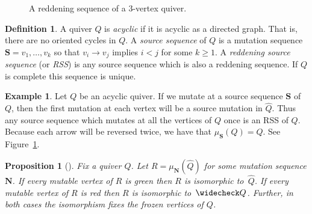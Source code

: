 \documentclass[11pt, letterpaper]{amsart}
\newtheorem{proposition}[theorem]{Proposition}
\theoremstyle{definition}
\newtheorem{example}[theorem]{Example}
\newtheorem{definition}[theorem]{Definition}
\numberwithin{equation}{section}
\begin{document}
\begin{figure}[ht]
\caption{A reddening sequence of a $3$-vertex quiver.}
\label{fig:source seq}
\end{figure}


\begin{definition}
\label{def:acyclic}
A quiver $Q$ is \emph{acyclic} if it is acyclic as a directed graph. That is, there are no oriented cycles in $Q$.
A \emph{source sequence} of $Q$ is a mutation sequence $\mathbf{S} = v_1, \ldots, v_k$ so that $v_i \rightarrow v_j$ implies $ i < j$ for some $k \geq 1$.
A \emph{reddening source sequence} (or \emph{RSS}) is any source sequence which is also a reddening sequence. 
If $Q$ is complete this sequence is unique.
\end{definition}

\begin{example}
\label{eg:source seq}
Let $Q$ be an acyclic quiver. 
If we mutate at a source sequence $\mathbf S$ of $Q$, then the first mutation at each vertex will be a source mutation in $\widehat{Q}$.
Thus any source sequence which mutates at all the vertices of $Q$ once is an RSS of $Q$.
Because each arrow will be reversed twice, we have that $\mu_{\mathbf S}(Q)= Q.$
See Figure~\ref{fig:source seq}. 
\end{example}


\begin{proposition}[{\cite[Proposition 2.10]{MR3250044}}] %
\label{prop:red/green gives iso}
Fix a quiver $Q$. 
Let $R = \mu_{\mathbf{N}}(\widehat Q)$ for some mutation sequence $\mathbf{N}$.
If every mutable vertex of $R$ is green then $R$ is isomorphic to~$\widehat Q$.
If every mutable vertex of $R$ is red then $R$ is isomorphic to~$\widecheck Q$.
Further, in both cases the isomorphism fixes the frozen vertices of $Q$.
\end{proposition}
\end{document}
